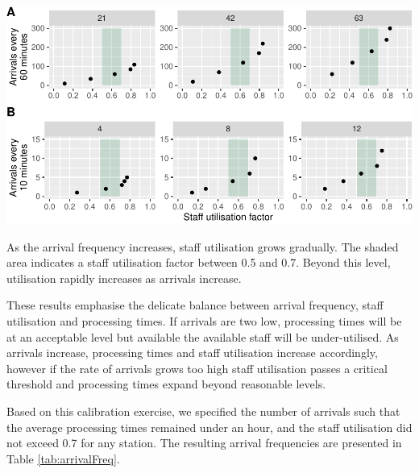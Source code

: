 \documentclass{article}
\let\origfigure\figure
\let\endorigfigure\endfigure
\renewenvironment{figure}[1][2] {
    \expandafter\origfigure\expandafter[H]
} {
    \endorigfigure
}
\begin{document}
\begin{figure}

{\centering \includegraphics{Preprint_files/figure-latex/staffUtilisation-1} 

}

\caption{Average staff utilisation by arrival frequency for a mass vaccination hub (A) and a GP vaccination clinic (B)}\label{fig:staffUtilisation}
\end{figure}

As the arrival frequency increases, staff utilisation grows gradually.
The shaded area indicates a staff utilisation factor between 0.5 and
0.7. Beyond this level, utilisation rapidly increases as arrivals
increase.

These results emphasise the delicate balance between arrival frequency,
staff utilisation and processing times. If arrivals are two low,
processing times will be at an acceptable level but available the
available staff will be under-utilised. As arrivals increase, processing
times and staff utilisation increase accordingly, however if the rate of
arrivals grows too high staff utilisation passes a critical threshold
and processing times expand beyond reasonable levels.

Based on this calibration exercise, we specified the number of arrivals
such that the average processing times remained under an hour, and the
staff utilisation did not exceed 0.7 for any station. The resulting
arrival frequencies are presented in Table \ref{tab:arrivalFreq}.
\end{document}
